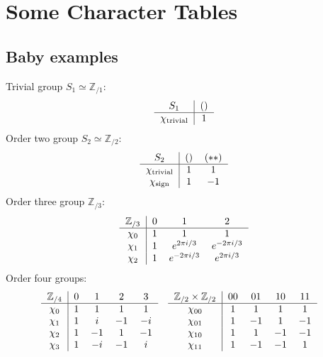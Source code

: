 \section{Some Character Tables} \label{sec:tables} %

\subsection{Baby examples} %
\pan Trivial group $S_1 \simeq \mathbb{Z}_{/1}$:
\begin{align*}
  \begin{tabular}{c|cc}
    $S_1$ & $()$ \\
    \hline
    $\chi_{\text{trivial}}$ & $1$ \\
  \end{tabular}
\end{align*}
\pan Order two group $S_2 \simeq \mathbb{Z}_{/2}$:
\begin{align*}
  \begin{tabular}{c|cc}
    $S_2$ & $()$ & $({*}{*})$ \\
    \hline
    $\chi_{\text{trivial}}$ & $1$ & $1$ \\
    $\chi_{\text{sign}}$ & $1$ & $-1$ \\
  \end{tabular}
\end{align*}
\pan Order three group $\mathbb{Z}_{/3}$:
\begin{align*}
  \begin{tabular}{c|ccc}
    $\mathbb{Z}_{/3}$ & $0$ & $1$ & $2$ \\
    \hline
    $\chi_{0}$ & $1$ & $1$ & $1$ \\
    $\chi_{1}$ & $1$ & $e^{2\pi i/3}$ & $e^{- 2\pi i/3}$ \\
    $\chi_{2}$ & $1$ & $e^{- 2\pi i/3}$ & $e^{2\pi i/3}$ \\
  \end{tabular}
\end{align*}
\pan Order four groups:
\begin{align*}
  & \begin{tabular}{c|cccc}
    $\mathbb{Z}_{/4}$ & $0$ & $1$ & $2$ & $3$ \\
    \hline
    $\chi_{0}$ & $1$ & $1$ & $1$ & $1$ \\
    $\chi_{1}$ & $1$ & $i$ & $-1$ & $-i$ \\
    $\chi_{2}$ & $1$ & $-1$ & $1$ & $-1$ \\
    $\chi_{3}$ & $1$ & $-i$ & $-1$ & $i$ \\
  \end{tabular}
  && \begin{tabular}{c|cccc}
    $\mathbb{Z}_{/2} \times \mathbb{Z}_{/2}$ & $00$ & $01$ & $10$ & $11$ \\
    \hline
    $\chi_{00}$ & $1$ & $1$   & $1$ & $1$ \\
    $\chi_{01}$ & $1$ & $-1$  & $1$ & $-1$ \\
    $\chi_{10}$ & $1$ & $1$   & $-1$ & $-1$ \\
    $\chi_{11}$ & $1$ & $-1$  & $-1$ & $1$ \\
  \end{tabular}
\end{align*}
